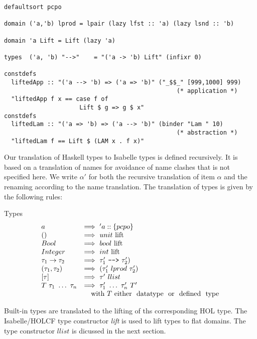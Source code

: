 \documentclass{llncs}
\begin{document}
\begin{verbatim} 
defaultsort pcpo

domain ('a,'b) lprod = lpair (lazy lfst :: 'a) (lazy lsnd :: 'b)

domain 'a Lift = Lift (lazy 'a)

types  ('a, 'b) "-->"    = "('a -> 'b) Lift" (infixr 0)

constdefs
  liftedApp :: "('a --> 'b) => ('a => 'b)" ("_$$_" [999,1000] 999)
                                                (* application *)
  "liftedApp f x == case f of
                     Lift $ g => g $ x"
constdefs
  liftedLam :: "('a => 'b) => ('a --> 'b)" (binder "Lam " 10)
                                                (* abstraction *)
  "liftedLam f == Lift $ (LAM x . f x)"
\end{verbatim}

Our translation of Haskell types to Isabelle types is defined
recursively.  It is based on a translation of names for avoidance of
name clashes that is not specified here. We write $\alpha'$ for both
the recursive translation of item $\alpha$ and the renaming according
to the name translation.  The translation of types is given by the
following rules:


\noindent Types
$$\begin{array}{ll}
  a & \Longrightarrow \ 'a::\{pcpo\} \\
  () & \Longrightarrow \ unit \ \mbox{lift} \\
  Bool & \Longrightarrow \ bool \ \mbox{lift} \\
  Integer & \Longrightarrow \ int \ \mbox{lift} \\
  \tau_{1} \to \tau_{2} & \Longrightarrow
  \ \tau'_{1} \ \verb@-->@ \ \tau'_{2})  \\
  (\tau_{1},\tau_{2}) & \Longrightarrow
  \ (\tau'_{1} ~lprod~ \tau'_{2}) \\
  {[\tau]} \ & \Longrightarrow \ \tau' \ llist \\
  T \ \tau_1 \ \ldots \ \tau_n & \Longrightarrow
  \ \tau'_1 \ \ldots \ \tau'_n \ T' \\
  & \quad \mbox{with} \ T \ \mbox{either \ datatype \ or \ defined \ type} \\
\end{array}$$

Built-in types are translated to the lifting of ths corresponding HOL
type.  The Isabelle/HOLCF type constructor \emph{lift} is used to lift
types to flat domains. The type constructor $llist$ is dicussed in the
next section.
\end{document}
